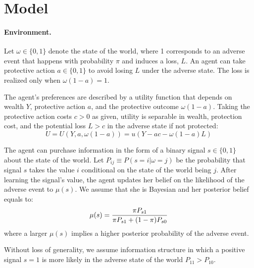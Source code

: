 \documentclass[12pt,a4paper]{article}
\begin{document}
\vspace{20pt}
\section{Model}\label{sec:model}
\paragraph{Environment.} Let $\omega \in \{0,1\}$ denote the state of the world, where 1 corresponds to an adverse event that happens with probability $\pi$ and induces a loss, $L$. An agent can take protective action $a\in\{0,1\}$ to avoid losing $L$ under the adverse state. The loss is realized only when $\omega(1-a)=1$.

The agent's preferences are described by a utility function that depends on wealth $Y$, protective action $a$, and the protective outcome $\omega(1-a)$. Taking the protective action costs $c>0$ as given, utility is separable in wealth, protection cost, and the potential loss $L>c$ in the adverse state if not protected:
\[
U=U(Y,a,\omega(1-a))=u(Y-ac-\omega(1-a)L)
\]

The agent can purchase information in the form of a binary signal $s\in\{0,1\}$ about the state of the world. Let $P_{ij}\equiv P(s=i|\omega=j)$ be the probability that signal $s$ takes the value $i$ conditional on the state of the world being $j$.  After learning the signal's value, the agent updates her belief on the likelihood of the adverse event to $\mu(s)$. We assume that she is Bayesian and her posterior belief equals to:
\[
\mu(s)= {\pi P_{s1} \over \pi P_{s1}+(1-\pi)P_{s0}}
\]
where a larger $\mu(s)$ implies a higher posterior probability of the adverse event.

Without loss of generality, we assume information structure in which a positive signal $s=1$ is more likely in the adverse state of the world $P_{11}>P_{10}$.

\vspace{10pt}
\end{document}
